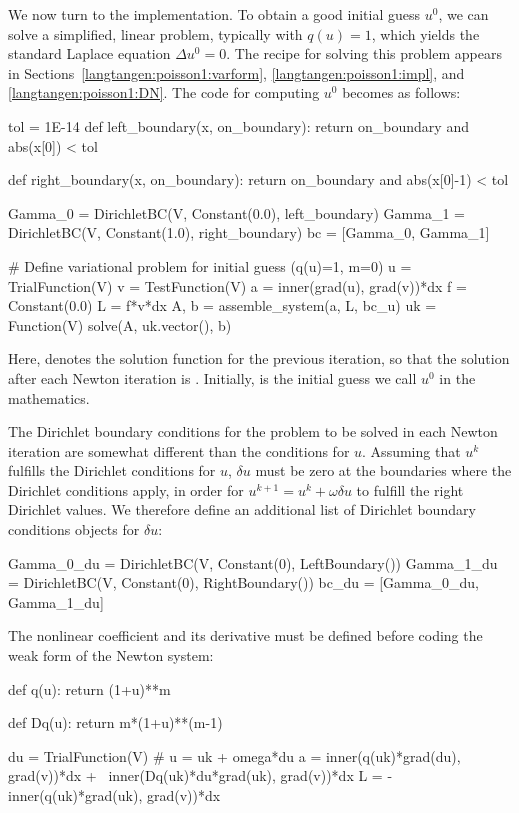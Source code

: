 We now turn to the implementation.  To obtain a good
initial guess $u^0$, we can solve a simplified, linear
problem, typically with $q(u)=1$, which yields the standard
Laplace equation $\Delta u^0 =0$. The recipe for solving this
problem appears in Sections~\ref{langtangen:poisson1:varform},
\ref{langtangen:poisson1:impl}, and \ref{langtangen:poisson1:DN}.
The code for computing $u^0$ becomes as follows:
\begin{python}
tol = 1E-14
def left_boundary(x, on_boundary):
    return on_boundary and abs(x[0]) < tol

def right_boundary(x, on_boundary):
    return on_boundary and abs(x[0]-1) < tol

Gamma_0 = DirichletBC(V, Constant(0.0), left_boundary)
Gamma_1 = DirichletBC(V, Constant(1.0), right_boundary)
bc = [Gamma_0, Gamma_1]

# Define variational problem for initial guess (q(u)=1, m=0)
u = TrialFunction(V)
v = TestFunction(V)
a = inner(grad(u), grad(v))*dx
f = Constant(0.0)
L = f*v*dx
A, b = assemble_system(a, L, bc_u)
uk = Function(V)
solve(A, uk.vector(), b)
\end{python}
Here,  denotes the solution function for the previous
iteration, so that the solution
after each Newton iteration is .
Initially,  is the initial guess we call $u^0$ in the mathematics.

The Dirichlet boundary conditions for the problem to be solved in each Newton
iteration are somewhat different than the conditions for $u$.
Assuming that $u^k$ fulfills the
Dirichlet conditions for $u$, $\delta u$ must be zero at the boundaries
where the Dirichlet conditions apply, in order for $u^{k+1}=u^k + \omega\delta u$ to fulfill
the right Dirichlet values. We therefore define an additional list of
Dirichlet boundary conditions objects for $\delta u$:
\begin{python}
Gamma_0_du = DirichletBC(V, Constant(0), LeftBoundary())
Gamma_1_du = DirichletBC(V, Constant(0), RightBoundary())
bc_du = [Gamma_0_du, Gamma_1_du]
\end{python}
The nonlinear coefficient and its derivative must be defined
before coding the weak form of the Newton system:
\begin{python}
def q(u):
    return (1+u)**m

def Dq(u):
    return m*(1+u)**(m-1)

du = TrialFunction(V) # u = uk + omega*du
a = inner(q(uk)*grad(du), grad(v))*dx + \
    inner(Dq(uk)*du*grad(uk), grad(v))*dx
L = -inner(q(uk)*grad(uk), grad(v))*dx
\end{python}

